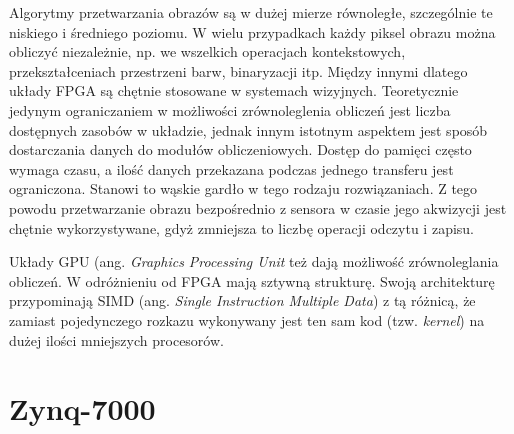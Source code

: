 Algorytmy przetwarzania obrazów są w dużej mierze równoległe, szczególnie te niskiego i średniego poziomu. W wielu przypadkach każdy piksel obrazu można obliczyć niezależnie, np. we wszelkich operacjach kontekstowych, przekształceniach przestrzeni barw, binaryzacji itp. Między innymi dlatego układy FPGA są chętnie stosowane w systemach wizyjnych. Teoretycznie jedynym ograniczaniem w możliwości zrównoleglenia obliczeń jest liczba dostępnych zasobów w układzie, jednak innym istotnym aspektem jest sposób dostarczania danych do modułów obliczeniowych.
Dostęp do pamięci często wymaga czasu, a ilość danych przekazana podczas jednego transferu jest ograniczona. Stanowi to wąskie gardło w tego rodzaju rozwiązaniach.
Z tego powodu przetwarzanie obrazu bezpośrednio z sensora w czasie jego akwizycji jest chętnie wykorzystywane, gdyż zmniejsza to liczbę operacji odczytu i zapisu. \cite{garcia2014survey}

Układy GPU (ang. \textit{Graphics Processing Unit} też dają możliwość zrównoleglania obliczeń. W odróżnieniu od FPGA mają sztywną strukturę. Swoją architekturę przypominają SIMD (ang. \textit{Single Instruction Multiple Data}) z tą różnicą, że zamiast pojedynczego rozkazu wykonywany jest ten sam kod (tzw. \textit{kernel}) na dużej ilości mniejszych procesorów.


\section{Zynq-7000}

